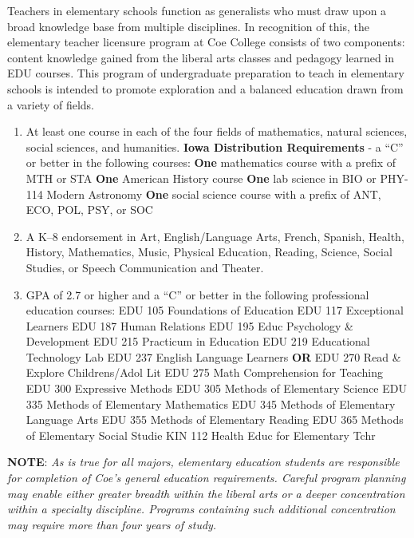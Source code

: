\documentclass[
  letterpaper,
]{scrbook}
\begin{document}
Teachers in elementary schools function as generalists who must draw
upon a broad knowledge base from multiple disciplines. In recognition of
this, the elementary teacher licensure program at Coe College consists
of two components: content knowledge gained from the liberal arts
classes and pedagogy learned in EDU courses. This program of
undergraduate preparation to teach in elementary schools is intended to
promote exploration and a balanced education drawn from a variety of
fields.

\begin{enumerate}
\def\labelenumi{\arabic{enumi}.}
\item
  At least one course in each of the four fields of mathematics, natural
  sciences, social sciences, and humanities. \textbf{Iowa Distribution
  Requirements} - a ``C'' or better in the following courses:
  \textbf{One} mathematics course with a prefix of MTH or STA
  \textbf{One} American History course \textbf{One} lab science in BIO
  or PHY-114 Modern Astronomy \textbf{One} social science course with a
  prefix of ANT, ECO, POL, PSY, or SOC
\item
  A K--8 endorsement in Art, English/Language Arts, French, Spanish,
  Health, History, Mathematics, Music, Physical Education, Reading,
  Science, Social Studies, or Speech Communication and Theater.
\item
  GPA of 2.7 or higher and a ``C'' or better in the following
  professional education courses: EDU 105 Foundations of Education EDU
  117 Exceptional Learners EDU 187 Human Relations EDU 195 Educ
  Psychology \& Development EDU 215 Practicum in Education EDU 219
  Educational Technology Lab EDU 237 English Language Learners
  \textbf{OR} EDU 270 Read \& Explore Childrens/Adol Lit EDU 275 Math
  Comprehension for Teaching EDU 300 Expressive Methods EDU 305 Methods
  of Elementary Science EDU 335 Methods of Elementary Mathematics EDU
  345 Methods of Elementary Language Arts EDU 355 Methods of Elementary
  Reading EDU 365 Methods of Elementary Social Studie KIN 112 Health
  Educ for Elementary Tchr
\end{enumerate}

\textbf{NOTE}: \emph{As is true for all majors, elementary education
students are responsible for completion of Coe's general education
requirements. Careful program planning may enable either greater breadth
within the liberal arts or a deeper concentration within a specialty
discipline. Programs containing such additional concentration may
require more than four years of study.}
\end{document}

